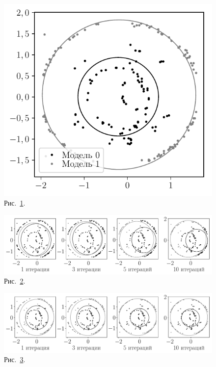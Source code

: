 \documentclass[12pt]{a&t}
\begin{document}
{\begin{figure}[h!]
\begin{center}
	\includegraphics[height = 0.17\textheight]{prior_regular_real_example}
\end{center}
\caption{Рис.~\ref{ce:fig6-1}.}
\label{ce:fig6-1}
\end{figure}

\begin{figure}[h!]
\begin{center}
     \includegraphics[width=\textwidth]{experiment_real_not_prior}
\end{center}
     \caption{Рис.~\ref{ce:fig7}.}
    \label{ce:fig7}
\end{figure}

\begin{figure}[h!]
\begin{center}
     \includegraphics[width=\textwidth]{experiment_real_prior}
\end{center}
     \caption{Рис.~\ref{ce:fig8}.}
    \label{ce:fig8}
\end{figure}

}
\end{document}
